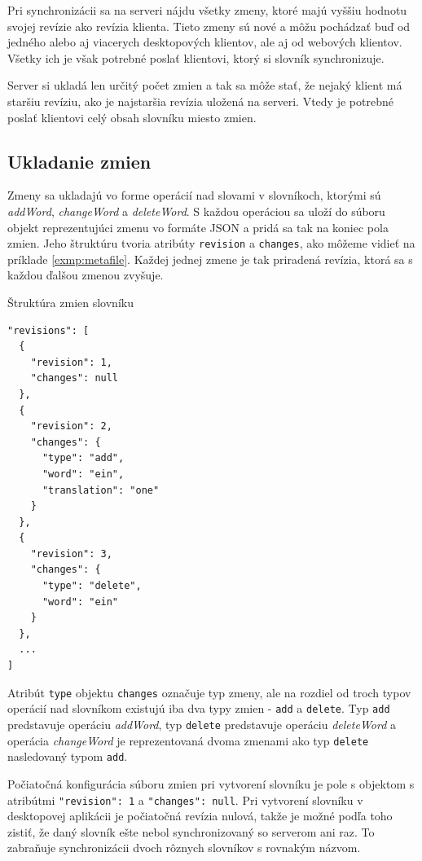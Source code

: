 \documentclass[
  digital, %
  table,   %
  lof,     %
  lot,     %
]{fithesis3}
\begin{document}
Pri synchronizácii sa na serveri nájdu všetky zmeny, ktoré majú vyššiu hodnotu svojej revízie ako revízia klienta. Tieto zmeny sú nové a môžu pochádzať buď od jedného alebo aj viacerych desktopových klientov, ale aj od webových klientov. Všetky ich je však potrebné poslať klientovi, ktorý si slovník synchronizuje.

Server si ukladá len určitý počet zmien a tak sa môže stať, že nejaký klient má staršiu revíziu, ako je najstaršia revízia uložená na serveri. Vtedy je potrebné poslať klientovi celý obsah slovníku miesto zmien.

\subsection{Ukladanie zmien}
Zmeny sa ukladajú vo forme operácií nad slovami v slovníkoch, ktorými sú \textit{addWord}, \textit{changeWord} a \textit{deleteWord}. S každou operáciou sa uloží do súboru objekt reprezentujúci zmenu vo formáte JSON a pridá sa tak na koniec pola zmien. Jeho štruktúru tvoria atribúty \texttt{revision} a \texttt{changes}, ako môžeme vidieť na príklade \ref{exmp:metafile}. Každej jednej zmene je tak priradená revízia, ktorá sa s každou ďalšou zmenou zvyšuje.

\begin{exmp}
\label{exmp:metafile}
Štruktúra zmien slovníku
\centering
\begin{lstlisting}[basicstyle=\small]
"revisions": [
  {
    "revision": 1,
    "changes": null
  },
  {
    "revision": 2,
    "changes": {
      "type": "add",
      "word": "ein",
      "translation": "one"
    }
  },
  {
    "revision": 3,
    "changes": {
      "type": "delete",
      "word": "ein"
    }
  },
  ...
]
\end{lstlisting}
\end{exmp}

Atribút \texttt{type} objektu \texttt{changes} označuje typ zmeny, ale na rozdiel od troch typov operácií nad slovníkom existujú iba dva typy zmien - \texttt{add} a \texttt{delete}. Typ \texttt{add} predstavuje operáciu \textit{addWord}, typ \texttt{delete} predstavuje operáciu \textit{deleteWord} a operácia \textit{changeWord} je reprezentovaná dvoma zmenami ako typ \texttt{delete} nasledovaný typom \texttt{add}.

Počiatočná konfigurácia súboru zmien pri vytvorení slovníku je pole s objektom s atribútmi \texttt{"revision": 1} a \texttt{"changes": null}. Pri vytvorení slovníku v desktopovej aplikácii je počiatočná revízia nulová, takže je možné podľa toho zistiť, že daný slovník ešte nebol synchronizovaný so serverom ani raz. To zabraňuje synchronizácii dvoch rôznych slovníkov s rovnakým názvom.
\end{document}
